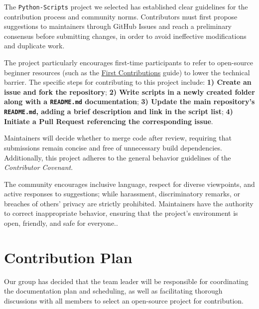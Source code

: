 \documentclass[12pt]{article}
\begin{document}
The \texttt{Python-Scripts} project we selected has established clear guidelines for the contribution process and community norms. Contributors must first propose suggestions to maintainers through GitHub Issues and reach a preliminary consensus before submitting changes, in order to avoid ineffective modifications and duplicate work. 

The project particularly encourages first-time participants to refer to open-source beginner resources (such as the \href{https://firstcontributions.github.io/}{First Contributions} guide) to lower the technical barrier. The specific steps for contributing to this project include: \textbf{1) Create an issue and fork the repository}; \textbf{2) Write scripts in a newly created folder along with a \texttt{README.md} documentation}; \textbf{3) Update the main repository's \texttt{README.md}, adding a brief description and link in the script list}; \textbf{4) Initiate a Pull Request referencing the corresponding issue}. 

Maintainers will decide whether to merge code after review, requiring that submissions remain concise and free of unnecessary build dependencies. Additionally, this project adheres to the general behavior guidelines of the \textit{Contributor Covenant}. 

The community encourages inclusive language, respect for diverse viewpoints, and active responses to suggestions; while harassment, discriminatory remarks, or breaches of others' privacy are strictly prohibited. Maintainers have the authority to correct inappropriate behavior, ensuring that the project's environment is open, friendly, and safe for everyone..



\section{Contribution Plan}

Our group has decided that the team leader will be responsible for coordinating the documentation plan and scheduling, as well as facilitating thorough discussions with all members to select an open-source project for contribution. 
\end{document}
